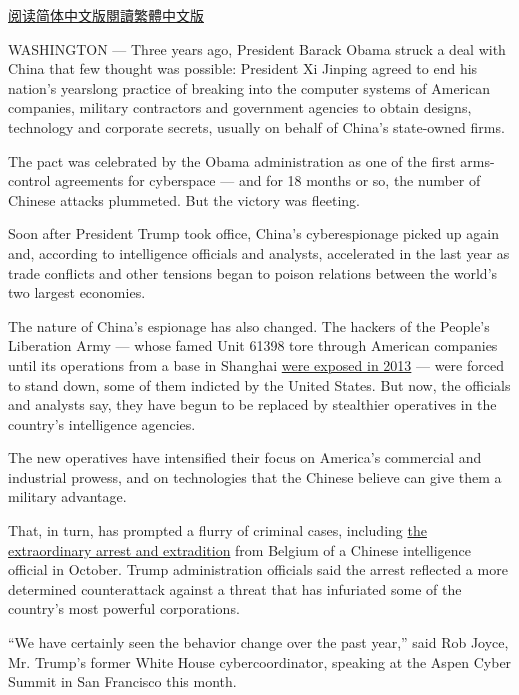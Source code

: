 \href{https://cn.nytimes.com/world/20181130/china-trump-cyberespionage/}{阅读简体中文版}\href{https://cn.nytimes.com/world/20181130/china-trump-cyberespionage/zh-hant/}{閱讀繁體中文版}

WASHINGTON --- Three years ago, President Barack Obama struck a deal
with China that few thought was possible: President Xi Jinping agreed to
end his nation's yearslong practice of breaking into the computer
systems of American companies, military contractors and government
agencies to obtain designs, technology and corporate secrets, usually on
behalf of China's state-owned firms.

The pact was celebrated by the Obama administration as one of the first
arms-control agreements for cyberspace --- and for 18 months or so, the
number of Chinese attacks plummeted. But the victory was fleeting.

Soon after President Trump took office, China's cyberespionage picked up
again and, according to intelligence officials and analysts, accelerated
in the last year as trade conflicts and other tensions began to poison
relations between the world's two largest economies.

The nature of China's espionage has also changed. The hackers of the
People's Liberation Army --- whose famed Unit 61398 tore through
American companies until its operations from a base in Shanghai
\href{https://www.nytimes.com/2013/02/19/technology/chinas-army-is-seen-as-tied-to-hacking-against-us.html}{were
exposed in 2013} --- were forced to stand down, some of them indicted by
the United States. But now, the officials and analysts say, they have
begun to be replaced by stealthier operatives in the country's
intelligence agencies.

The new operatives have intensified their focus on America's commercial
and industrial prowess, and on technologies that the Chinese believe can
give them a military advantage.

That, in turn, has prompted a flurry of criminal cases, including
\href{https://www.nytimes.com/2018/10/10/us/politics/china-spy-espionage-arrest.html}{the
extraordinary arrest and extradition} from Belgium of a Chinese
intelligence official in October. Trump administration officials said
the arrest reflected a more determined counterattack against a threat
that has infuriated some of the country's most powerful corporations.

``We have certainly seen the behavior change over the past year,'' said
Rob Joyce, Mr. Trump's former White House cybercoordinator, speaking at
the Aspen Cyber Summit in San Francisco this month.

